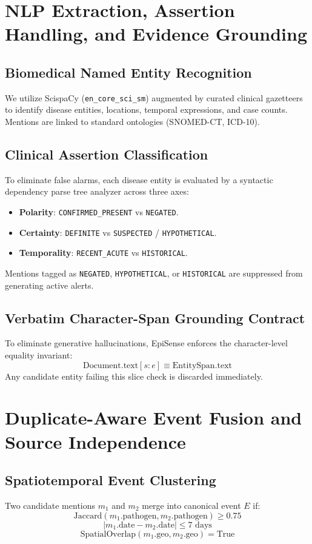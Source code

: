 \documentclass[conference]{IEEEtran}
\begin{document}
\section{NLP Extraction, Assertion Handling, and Evidence Grounding}
\subsection{Biomedical Named Entity Recognition}
We utilize ScispaCy (\texttt{en\_core\_sci\_sm}) augmented by curated clinical gazetteers to identify disease entities, locations, temporal expressions, and case counts. Mentions are linked to standard ontologies (SNOMED-CT, ICD-10).

\subsection{Clinical Assertion Classification}
To eliminate false alarms, each disease entity is evaluated by a syntactic dependency parse tree analyzer across three axes:
\begin{itemize}
    \item \textbf{Polarity}: \texttt{CONFIRMED\_PRESENT} vs \texttt{NEGATED}.
    \item \textbf{Certainty}: \texttt{DEFINITE} vs \texttt{SUSPECTED} / \texttt{HYPOTHETICAL}.
    \item \textbf{Temporality}: \texttt{RECENT\_ACUTE} vs \texttt{HISTORICAL}.
\end{itemize}
Mentions tagged as \texttt{NEGATED}, \texttt{HYPOTHETICAL}, or \texttt{HISTORICAL} are suppressed from generating active alerts.

\subsection{Verbatim Character-Span Grounding Contract}
To eliminate generative hallucinations, EpiSense enforces the character-level equality invariant:
\begin{equation}
\text{Document.text}[s:e] \equiv \text{EntitySpan.text}
\end{equation}
Any candidate entity failing this slice check is discarded immediately.

\section{Duplicate-Aware Event Fusion and Source Independence}
\subsection{Spatiotemporal Event Clustering}
Two candidate mentions $m_1$ and $m_2$ merge into canonical event $E$ if:
\begin{equation}
\text{Jaccard}(m_1.\text{pathogen}, m_2.\text{pathogen}) \ge 0.75
\end{equation}
\begin{equation}
|m_1.\text{date} - m_2.\text{date}| \le 7\text{ days}
\end{equation}
\begin{equation}
\text{SpatialOverlap}(m_1.\text{geo}, m_2.\text{geo}) = \text{True}
\end{equation}
\end{document}

